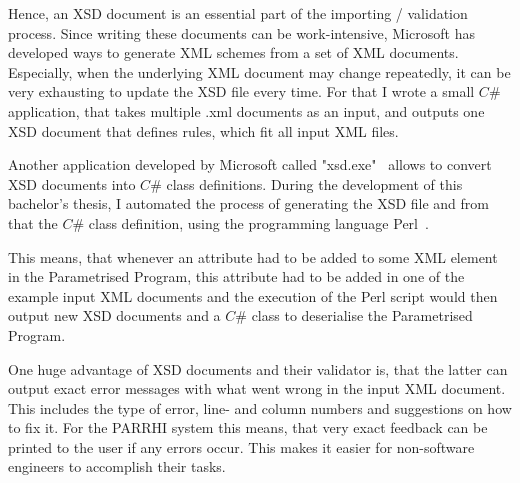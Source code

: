 Hence, an XSD document is an essential part of the importing / validation process. Since writing these documents can be work-intensive, Microsoft has developed ways to generate XML schemes from a set of XML documents. Especially, when the underlying XML document may change repeatedly, it can be very exhausting to update the XSD file every time. For that I wrote a small $C\#$ application, that takes multiple .xml documents as an input, and outputs one XSD document that defines rules, which fit all input XML files. 

Another application developed by Microsoft called "xsd.exe"~\cite{xsdExe} allows to convert XSD documents into $C\#$ class definitions. During the development of this bachelor's thesis, I automated the process of generating the XSD file and from that the $C\#$ class definition, using the programming language Perl~\cite{perl}.

This means, that whenever an attribute had to be added to some XML element in the Parametrised Program, this attribute had to be added in one of the example input XML documents and the execution of the Perl script would then output new XSD documents and a $C\#$ class to deserialise the Parametrised Program. 

One huge advantage of XSD documents and their validator is, that the latter can output exact error messages with what went wrong in the input XML document. This includes the type of error, line- and column numbers and suggestions on how to fix it. For the PARRHI system this means, that very exact feedback can be printed to the user if any errors occur. This makes it easier for non-software engineers to accomplish their tasks.











